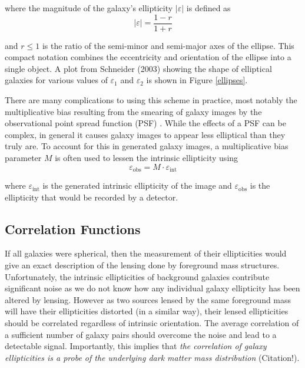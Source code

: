 \documentclass[%
 reprint,
 amsmath,amssymb,
 aps,nofootinbib
]{revtex4-1}
\begin{document}
\noindent where the magnitude of the galaxy's ellipticity $|\varepsilon|$ is defined as
\begin{equation}
|\varepsilon|=\frac{1-r}{1+r}
\end{equation}

\noindent and $r\leq1$ is the ratio of the semi-minor and semi-major axes of the ellipse. This compact notation combines the eccentricity and orientation of the ellipse into a single object. A plot from Schneider (2003) \cite{schneider} showing the shape of elliptical galaxies for various values of $\varepsilon_1$ and $\varepsilon_2$ is shown in Figure \ref{ellipses}.

There are many complications to using this scheme in practice, most notably the multiplicative bias resulting from the smearing of galaxy images by the observational point spread function (PSF) \cite{multiplicative_bias}. While the effects of a PSF can be complex, in general it causes galaxy images to appear less elliptical than they truly are. To account for this in generated galaxy images, a multiplicative bias parameter $M$ is often used to lessen the intrinsic ellipticity using
\begin{equation}\label{mult_bias}
\varepsilon_{\text{obs}}=M\cdot\varepsilon_{\text{int}}
\end{equation}

\noindent where $\varepsilon_{\text{int}}$ is the generated intrinsic ellipticity of the image and $\varepsilon_{\text{obs}}$ is the ellipticity that would be recorded by a detector.


\subsection{Correlation Functions} \label{corr_functions}

If all galaxies were spherical, then the measurement of their ellipticities would give an exact description of the lensing done by foreground mass structures. Unfortunately, the intrinsic ellipticities of background galaxies contribute significant noise as we do not know how any individual galaxy ellipticity has been altered by lensing. However as two sources lensed by the same foreground mass will have their ellipticities distorted (in a similar way), their lensed ellipticities should be correlated regardless of intrinsic orientation. The average correlation of a sufficient number of galaxy pairs should overcome the noise and lead to a detectable signal. Importantly, this implies that \textit{the correlation of galaxy ellipticities is a probe of the underlying dark matter mass distribution} (Citation!).
\end{document}
